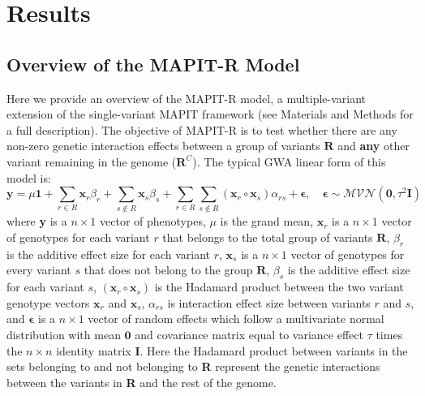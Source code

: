 \documentclass[12pt,a4paper]{article}
\begin{document}
\section{Results}\label{InterPath-Results}

%
%

\subsection{Overview of the MAPIT-R Model}\label{InterPath-Results-MAPITRModel}

Here we provide an overview of the MAPIT-R model, a multiple-variant extension of the single-variant MAPIT framework (see Materials and Methods for a full description). The objective of MAPIT-R is to test whether there are any non-zero genetic interaction effects between a group of variants $\textbf{R}$ and \textbf{any} other variant remaining in the genome ($\textbf{R}^C$). The typical GWA linear form of this model is:  
\begin{equation}\label{Overview1}
\textbf{y} = \mu\textbf{1} + \sum_{r \in R} \textbf{x}_r\beta_r + \sum_{s \not\in R} \textbf{x}_s\beta_s + \sum_{r \in R}\sum_{s \not\in R} (\textbf{x}_r \circ \textbf{x}_s)\alpha_{rs} + \boldsymbol{\epsilon}, \quad \boldsymbol{\epsilon} \sim \mathcal{MVN}(\textbf{0}, \tau^{2}\textbf{I})  
\end{equation}
where \textbf{y} is a $n \times 1$ vector of phenotypes, $\mu$ is the grand mean, $\textbf{x}_r$ is a $n \times 1$ vector of genotypes for each variant $r$ that belongs to the total group of variants $\textbf{R}$, $\beta_r$ is the additive effect size for each variant $r$, $\textbf{x}_s$ is a $n \times 1$ vector of genotypes for every variant $s$ that does not belong to the group $\textbf{R}$, $\beta_s$ is the additive effect size for each variant $s$, $(\textbf{x}_r \circ \textbf{x}_s)$ is the Hadamard product between the two variant genotype vectors $\textbf{x}_r$ and $\textbf{x}_s$, $\alpha_{rs}$ is interaction effect size between variants $r$ and $s$, and $\boldsymbol{\epsilon}$ is a $n \times 1$ vector of random effects which follow a multivariate normal distribution with mean $\textbf{0}$ and covariance matrix equal to variance effect $\tau$ times the $n \times n$ identity matrix $\textbf{I}$. Here the Hadamard product between variants in the sets belonging to and not belonging to \textbf{R} represent the genetic interactions between the variants in \textbf{R} and the rest of the genome.
\end{document}
